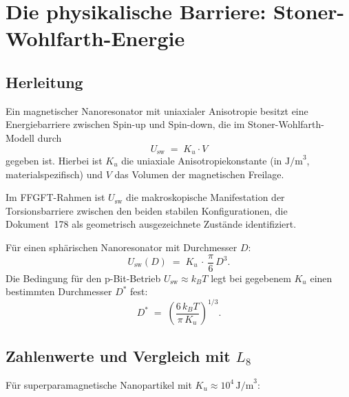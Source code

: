 	\section{Die physikalische Barriere: Stoner-Wohlfarth-Energie}
	\label{sec:stoner-wohlfarth}
	
	\subsection{Herleitung}
	\label{subsec:sw-herleitung}
	
	Ein magnetischer Nanoresonator mit uniaxialer Anisotropie besitzt eine
	Energiebarriere zwischen Spin-up und Spin-down, die im
	Stoner-Wohlfarth-Modell \cite{Stoner1948} durch
	\begin{equation}
		U_\text{sw} \;=\; K_u \cdot V
		\label{eq:stoner-wohlfarth}
	\end{equation}
	gegeben ist. Hierbei ist $K_u$ die uniaxiale Anisotropiekonstante
	(in $\text{J/m}^3$, materialspezifisch) und $V$ das Volumen der
	magnetischen Freilage.
	
	Im FFGFT-Rahmen ist $U_\text{sw}$ die makroskopische Manifestation
	der Torsionsbarriere zwischen den beiden stabilen Konfigurationen,
	die Dokument~178 als geometrisch ausgezeichnete Zustände identifiziert.
	
	Für einen sphärischen Nanoresonator mit Durchmesser $D$:
	\begin{equation}
		U_\text{sw}(D) \;=\; K_u\,\cdot\,\frac{\pi}{6}\,D^3.
		\label{eq:barriere-geometrisch}
	\end{equation}
	Die Bedingung für den p-Bit-Betrieb $U_\text{sw} \approx k_B T$ legt
	bei gegebenem $K_u$ einen bestimmten Durchmesser $D^*$ fest:
	\begin{equation}
		D^* \;=\; \left(\frac{6\,k_B T}{\pi\,K_u}\right)^{1/3}.
		\label{eq:d-stern}
	\end{equation}
	
	\subsection{Zahlenwerte und Vergleich mit \texorpdfstring{$L_8$}{L8}}
	\label{subsec:pbit-regime}
	
	Für superparamagnetische Nanopartikel mit
	$K_u \approx 10^4\,\text{J/m}^3$:
	
